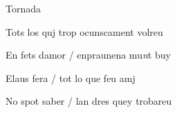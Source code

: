 \documentclass[12pt]{article}
\begin{document}
\begin{estrofaExtra}%




\begin{tornada}

Tornada

\end{tornada}


\end{estrofaExtra}


\begin{estrofa}

 Tots los quj trop ocunscament volreu

 En fets damor / enpraunena mu\textit{n}t buy

 Elaus fera / tot lo que feu amj

 No spot saber / lan dres quey trobareu

\end{estrofa}
\end{document}
